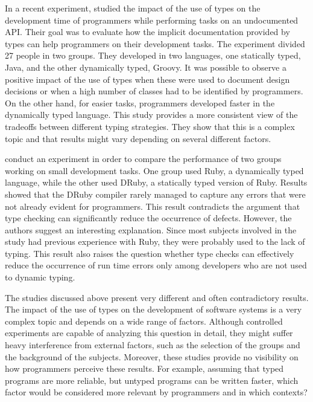 \documentclass[msc]{ppgccufmg}
\begin{document}
In a recent experiment, \cite{Hanenberg13} studied the impact of the use of types on the development time of programmers while performing tasks on an undocumented API.
Their goal was to evaluate how the implicit documentation provided by types can help programmers on their development tasks.
The experiment divided 27 people in two groups.
They developed in two languages, one statically typed, Java, and the other dynamically typed, Groovy.
It was possible to observe a positive impact of the use of types when these were used to document design decisions or when a high number of classes had to be identified by programmers.
On the other hand, for easier tasks, programmers developed faster in the dynamically typed language.
This study provides a more consistent view of the tradeoffs between different typing strategies.
They show that this is a complex topic and that results might vary depending on several different factors.

\cite{ruby_vs_druby} conduct an experiment in order to compare the performance of two groups working on small development tasks.
One group used Ruby, a dynamically typed language, while the other used DRuby, a statically typed version of Ruby. 
Results showed that the DRuby compiler rarely managed to capture any errors that were not already evident for programmers.
This result contradicts the argument that type checking can significantly reduce the occurrence of defects.
However, the authors suggest an interesting explanation.
Since most subjects involved in the study had previous experience with Ruby, they were probably used to the lack of typing.
This result also raises the question whether type checks can effectively reduce the occurrence of run time errors only among developers who are not used to dynamic typing.

The studies discussed above present very different and often contradictory results.
The impact of the use of types on the development of software systems is a very complex topic and depends on a wide range of factors.
Although controlled experiments are capable of analyzing this question in detail, they might suffer heavy interference from external factors, such as the selection of the groups and the background of the subjects.
Moreover, these studies provide no visibility on how programmers perceive these results.
For example, assuming that typed programs are more reliable, but untyped programs can be written faster, which factor would be considered more relevant by programmers and in which contexts?
\end{document}
